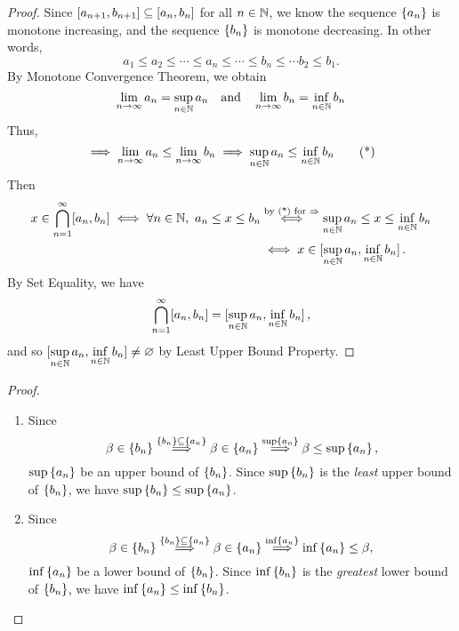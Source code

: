 \documentclass[11pt,openany]{article}
\begin{document}
\begin{proof}
	Since $\intcc{a_{n+1},b_{n+1}}\subseteq\intcc{a_n,b_n}$ for all $n\in\mathbb{N}$, we know  the sequence $\set{a_n}$ is monotone increasing, and the sequence $\set{b_n}$ is monotone decreasing. In other words, \[
	a_1\leq a_2\leq\cdots\leq a_n\leq \cdots\leq b_n\leq\cdots b_2\leq b_1.
	\] By Monotone Convergence Theorem, we obtain \[
	\lim\limits_{n\to\infty}a_n=\sup_{n\in\mathbb{N}} a_n\quad\text{and}\quad\lim\limits_{n\to\infty}b_n=\inf\limits_{n\in\mathbb{N}}b_n
	\]
	Thus, \begin{equation*}
	[\forall n\in\N,\ a_n\leq b_n]\implies \lim\limits_{n\to\infty}a_n\leq\lim\limits_{n\to\infty}b_n\\
	\implies\sup\limits_{n\in\N} a_n\leq\inf\limits_{n\in\N} b_n\tag{*}
\end{equation*}
Then \begin{align*}
x\in\bigcap_{n=1}^\infty[a_n,b_n]\iff \forall n\in\N,\ a_n\leq x\leq b_n
&\overset{\text{by (*) for $\Rightarrow$}}{\iff} \sup\limits_{n\in\N} a_n\leq x\leq \inf\limits_{n\in\N} b_n\\
&\iff x\in\intcc[0]{\sup\limits_{n\in\N} a_n, \inf\limits_{n\in\N} b_n}.
\end{align*} By Set Equality, we have \[
\bigcap_{n=1}^\infty[a_n,b_n]=\intcc[0]{\sup\limits_{n\in\N} a_n, \inf\limits_{n\in\N} b_n},
\] and so $\intcc[0]{\sup\limits_{n\in\N} a_n, \inf\limits_{n\in\N} b_n}\neq\varnothing$ by Least Upper Bound Property.
\end{proof}

\newpage\noindent
{}
\begin{proof}
\begin{enumerate}[(1)]
	\item Since \[
	\beta\in \set{b_n}\overset{\set{b_n}\subseteq \set{a_n}}{\implies}\beta\in \set{a_n}\overset{\sup \set{a_n}}{\implies}\beta\leq \sup \set{a_n},
	\] $\sup \set{a_n}$ be an upper bound of $\set{b_n}$. Since $\sup \set{b_n}$ is the \textit{least} upper bound of $\set{b_n}$, we have $\sup \set{b_n}\leq\sup \set{a_n}$.
	\item Since \[
	\beta\in \set{b_n}\overset{\set{b_n}\subseteq \set{a_n}}{\implies}\beta\in \set{a_n}\overset{\inf \set{a_n}}{\implies}\inf \set{a_n}\leq \beta,
	\] $\inf \set{a_n}$ be a lower bound of $\set{b_n}$. Since $\inf \set{b_n}$ is the \textit{greatest} lower bound of $\set{b_n}$, we have $\inf \set{a_n}\leq\inf \set{b_n}$.
\end{enumerate}
\end{proof}
\end{document}
